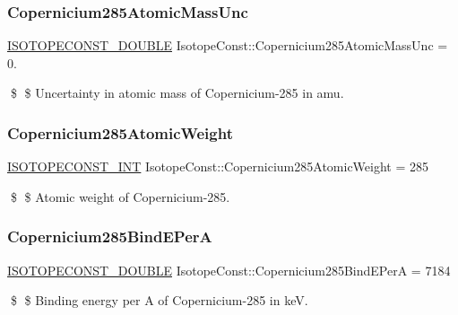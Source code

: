 \subsubsection{\texorpdfstring{Copernicium285\+Atomic\+Mass\+Unc}{Copernicium285AtomicMassUnc}}
{\footnotesize\ttfamily \mbox{\hyperlink{group___isotope_const-_macros_ga8f45a7272ce02c0b4c65c44636ed719a}{I\+S\+O\+T\+O\+P\+E\+C\+O\+N\+S\+T\+\_\+\+D\+O\+U\+B\+LE}} Isotope\+Const\+::\+Copernicium285\+Atomic\+Mass\+Unc = 0.}

\$ \$ Uncertainty in atomic mass of Copernicium-\/285 in amu. \mbox{\label{group___isotope_const-_copernicium-_cn285_ga2b5b180853cc5e3e2187097e636a2f34}} 
\subsubsection{\texorpdfstring{Copernicium285\+Atomic\+Weight}{Copernicium285AtomicWeight}}
{\footnotesize\ttfamily \mbox{\hyperlink{group___isotope_const-_macros_ga5f18360b3e99483a35c32d789e62621c}{I\+S\+O\+T\+O\+P\+E\+C\+O\+N\+S\+T\+\_\+\+I\+NT}} Isotope\+Const\+::\+Copernicium285\+Atomic\+Weight = 285}

\$ \$ Atomic weight of Copernicium-\/285. \mbox{\label{group___isotope_const-_copernicium-_cn285_gaf5b41a56e21f9167047886c463b17545}} 
\subsubsection{\texorpdfstring{Copernicium285\+Bind\+E\+PerA}{Copernicium285BindEPerA}}
{\footnotesize\ttfamily \mbox{\hyperlink{group___isotope_const-_macros_ga8f45a7272ce02c0b4c65c44636ed719a}{I\+S\+O\+T\+O\+P\+E\+C\+O\+N\+S\+T\+\_\+\+D\+O\+U\+B\+LE}} Isotope\+Const\+::\+Copernicium285\+Bind\+E\+PerA = 7184}

\$ \$ Binding energy per A of Copernicium-\/285 in keV. \mbox{\label{group___isotope_const-_copernicium-_cn285_ga2774aee5bb2c634b5893a302f34d2bf8}} 
